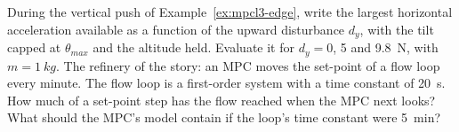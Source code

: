 \begin{exercises}
\exercise[3] During the vertical push of Example~\ref{ex:mpcl3-edge}, write the largest horizontal acceleration available as a function of the upward disturbance $d_y$, with the tilt capped at $\theta_{max}$ and the altitude held. Evaluate it for $d_y = 0$, 5 and \SI{9.8}{N}, with $m = \SI{1}{kg}$.
\exercise[3] The refinery of the story: an MPC moves the set-point of a flow loop every minute. The flow loop is a first-order system with a time constant of \SI{20}{s}. How much of a set-point step has the flow reached when the MPC next looks? What should the MPC's model contain if the loop's time constant were \SI{5}{min}?
\end{exercises}
